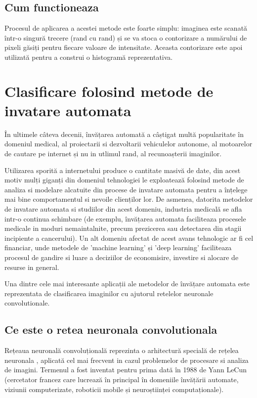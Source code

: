 \documentclass[10pt]{article}
\begin{document}
\subsection{Cum functioneaza}

\> Procesul de aplicarea a acestei metode este foarte simplu:
imaginea este scanată într-o singură trecere (rand cu rand) și se va stoca o contorizare a numărului de pixeli găsiți pentru fiecare valoare de intensitate.
Aceasta contorizare este apoi utilizată pentru a construi o histogramă reprezentativa.

\newpage

\section{Clasificare folosind metode de invatare automata}

\> În ultimele câteva decenii, învățarea automată a câștigat multă popularitate în domeniul medical,
al proiectarii si dezvoltarii vehiculelor autonome, al motoarelor de cautare pe internet și nu in utlimul rand, al recunoașterii imaginilor.

\> Utilizarea sporită a internetului produce o cantitate masivă de date, din acest motiv mulți giganți din domeniul tehnologiei le exploatează folosind
metode de analiza si modelare alcatuite din procese de invatare automata pentru a înțelege mai bine comportamentul si nevoile clienților lor.
De asmenea, datorita metodelor de invatare automata si studiilor din acest domeniu, 
industria medicală se afla intr-o continua schimbare (de exemplu, învățarea automata faciliteaza procesele medicale in moduri nemaintalnite, precum prezicerea
sau detectarea din stagii incipiente a cancerului). Un alt domeniu afectat de acest avans tehnologic ar fi cel financiar,
unde metodele de 'machine learning' și 'deep learning' faciliteaza procesul de gandire si luare a deciziilor de economisire, investire si alocare de resurse in general.

\> Una dintre cele mai interesante aplicații ale metodelor de învățare automata este reprezentata de clasificarea imaginilor cu ajutorul retelelor neuronale convolutionale.

\subsection{Ce este o retea neuronala convolutionala}

\> Rețeaua neuronală convoluțională reprezinta o arhitectură specială de rețelea neuronala , aplicată cel mai frecvent in cazul problemelor de procesare si analiza de imagini.
Termenul a fost inventat pentru prima dată în 1988 de Yann LeCun (cercetator francez care lucrează în principal în domeniile învățării automate, viziunii computerizate, roboticii mobile și neuroștiinței computaționale).
\end{document}
